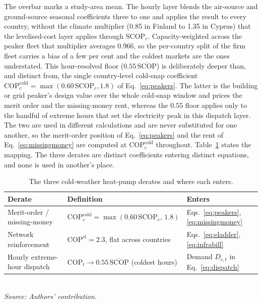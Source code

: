 The overbar marks a study-area mean. The hourly layer blends the air-source and
ground-source seasonal coefficients three to one and applies the result to every
country, without the climate multiplier (0.85 in Finland to 1.35 in Cyprus) that the
levelised-cost layer applies through $\mathrm{SCOP}_{c}$. Capacity-weighted across the
peaker fleet that multiplier averages 0.966, so the per-country split of the firm fleet
carries a bias of a few per cent and the coldest markets are the ones understated. This
hour-resolved floor ($0.55\,\overline{\mathrm{SCOP}}$) is deliberately deeper than, and
distinct from, the single country-level cold-snap coefficient
$\mathrm{COP}^{\mathrm{cold}}_{c}=\max(0.60\,\mathrm{SCOP}_{c},1.8)$ of
Eq.~\eqref{eq:peakers}. The latter is the building or grid peaker's design value over
the whole cold-snap window and prices the merit order and the missing-money rent,
whereas the $0.55$ floor applies only to the handful of extreme hours that set the
electricity peak in this dispatch layer. The two are used in different calculations and
are never substituted for one another, so the merit-order position of
Eq.~\eqref{eq:peakers} and the rent of Eq.~\eqref{eq:missingmoney} are computed at
$\mathrm{COP}^{\mathrm{cold}}_{c}$ throughout. Table~\ref{tab:copmap} states the mapping. The three derates are distinct coefficients entering distinct equations, and none is used in another's place.

\begin{table}[H]
    \centering
    \caption{The three cold-weather heat-pump derates and where each enters.}
    \label{tab:copmap}
    \small
    \begin{tabular}{@{}p{}p{}p{}@{}}
        \toprule
        Derate & Definition & Enters \\
        \midrule
        Merit-order / missing-money
            & $\mathrm{COP}^{\mathrm{cold}}_{c}=\max(0.60\,\mathrm{SCOP}_{c},\,1.8)$ & Eqs.~\eqref{eq:peakers}, \eqref{eq:missingmoney} \\ Network reinforcement & $\mathrm{COP}^{\mathrm{el}}=2.3$, flat across countries & Eqs.~\eqref{eq:eladder}, \eqref{eq:infrabill} \\
        Hourly extreme-hour dispatch
            & $\mathrm{COP}_{t}\to 0.55\,\overline{\mathrm{SCOP}}$ (coldest hours)
            & Demand $D_{c,t}$ in Eq.~\eqref{eq:dispatch} \\
        \bottomrule
    \end{tabular}
    \\[8pt]{\footnotesize\textit{Source: Authors' contribution.}}
\end{table}

